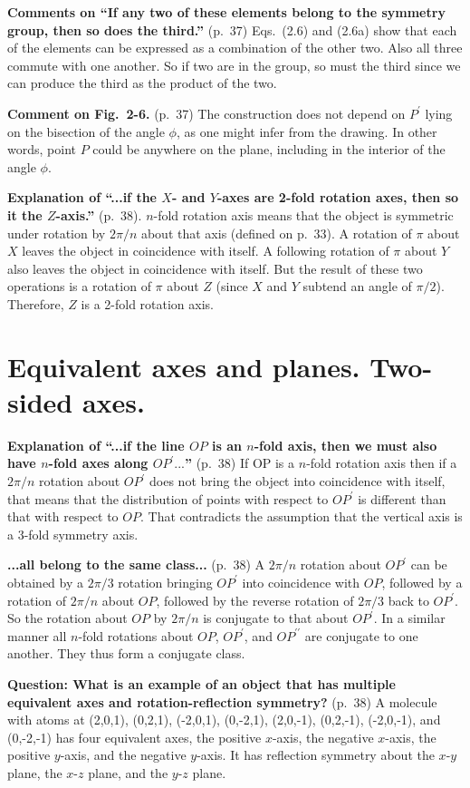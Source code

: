 {\bf Comments on ``If any two of these elements belong to the symmetry
  group, then so does the third.''} (p.\ 37) Eqs.\ (2.6) and (2.6a)
show that each of the elements can be expressed as a combination of
the other two. Also all three commute with one another. So if two are
in the group, so must the third since we can produce the third as the
product of the two.

{\bf Comment on Fig.\ 2-6.} (p.\ 37) The construction does not depend
on $P^\prime$ lying on the bisection of the angle $\phi$, as one might
infer from the drawing. In other words, point $P$ could be anywhere on
the plane, including in the interior of the angle $\phi$.

{\bf Explanation of ``...if the $X$- and $Y$-axes are 2-fold rotation
  axes, then so it the $Z$-axis.''} (p.\ 38). $n$-fold rotation axis
means that the object is symmetric under rotation by $2\pi/n$ about
that axis (defined on p.\ 33).  A rotation of $\pi$ about $X$ leaves
the object in coincidence with itself. A following rotation of $\pi$
about $Y$ also leaves the object in coincidence with itself. But the
result of these two operations is a rotation of $\pi$ about $Z$ (since
$X$ and $Y$ subtend an angle of $\pi/2$). Therefore, $Z$ is a 2-fold
rotation axis.

\section{Equivalent axes and planes. Two-sided axes.}

{\bf Explanation of ``...if the line $OP$ is an $n$-fold axis, then we
  must also have $n$-fold axes along $OP^\prime...$''} (p.\ 38) If OP
is a $n$-fold rotation axis then if a $2\pi/n$ rotation about $OP^\prime$
does not bring the object into coincidence with itself, that means
that the distribution of points with respect to $OP^\prime$ is
different than that with respect to $OP$. That contradicts the
assumption that the vertical axis is a 3-fold symmetry axis.

{\bf ...all belong to the same class...} (p.\ 38) A $2\pi/n$ rotation about
$OP^\prime$ can be obtained by a $2\pi/3$ rotation bringing $OP^\prime$ into
coincidence with $OP$, followed by a rotation of $2\pi/n$ about $OP$,
followed by the reverse rotation of $2\pi/3$ back to $OP^\prime$. So the
rotation about $OP$ by $2\pi/n$ is conjugate to that about $OP^\prime$. In a
similar manner all $n$-fold rotations about $OP$, $OP^\prime$, and
$OP^{\prime\prime}$ are conjugate to one another. They thus form a
conjugate class.

{\bf Question: What is an example of an object that has multiple equivalent axes and rotation-reflection symmetry?} (p.\ 38)
A molecule with atoms at (2,0,1), (0,2,1), (-2,0,1), (0,-2,1), (2,0,-1), (0,2,-1), (-2,0,-1), and (0,-2,-1) has four equivalent axes, the positive $x$-axis, the negative $x$-axis, the positive $y$-axis, and the negative $y$-axis. It has reflection symmetry about the $x$-$y$ plane, the $x$-$z$ plane, and the $y$-$z$ plane.
